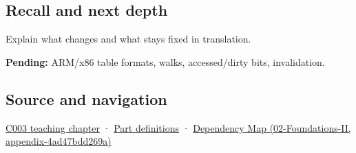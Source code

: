 \subsection{Recall and next depth}\label{recall-and-next-depth}

Explain what changes and what stays fixed in translation.

\textbf{Pending:} ARM/x86 table formats, walks, accessed/dirty bits, invalidation.

\subsection{Source and navigation}\label{source-and-navigation}

\href{Continuous\%20Notes/Computing\%20Foundations\%20-\%20From\%20Bits\%20to\%20C++\%20and\%20Systems\%20APIs\#Where\%20the\%20bytes\%20live}{C003 teaching chapter} · \hyperref[appendix-fd090d982a15]{Part definitions} · \href{}{Dependency Map (02-Foundations-II, appendix-4ad47bdd269a)}
